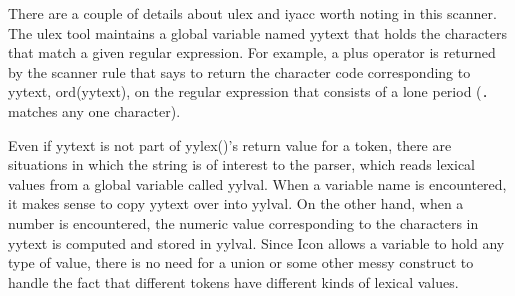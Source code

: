 
There are a couple of details about \textsf{ulex} and \textsf{iyacc}
worth noting in this scanner. The \textsf{ulex} tool maintains a global
variable named \textsf{yytext} that holds the characters that match a
given regular expression. For example, a plus operator is returned by
the scanner rule that says to return the character code corresponding
to \textsf{yytext}, \textsf{ord(yytext)}, on the regular expression
that consists of a lone period (\texttt{.} matches any one character).

Even if \textsf{yytext} is not part of \textsf{yylex()}'s
return value for a token, there are situations in which the string is of
interest to the parser, which reads lexical values from a global variable called
\textsf{yylval}.  When a variable name is encountered, it makes sense to copy
\textsf{yytext} over into \textsf{yylval}. On the other hand, when a number is
encountered, the numeric value corresponding to the characters in
\textsf{yytext} is computed and stored in \textsf{yylval}. Since Icon allows a
variable to hold any type of value, there is no need for a union or some other
messy construct to handle the fact that different tokens have different kinds of
lexical values.

